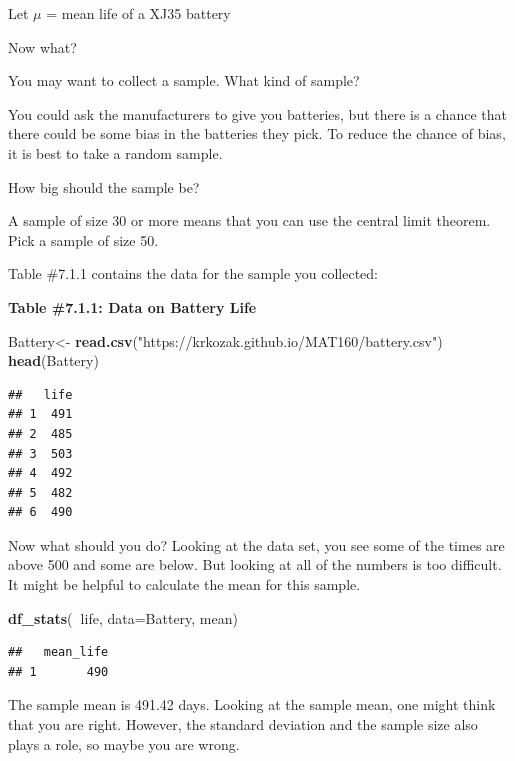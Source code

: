 \documentclass[
]{book}
\newenvironment{Shaded}{\begin{snugshade}}{\end{snugshade}}
\newcommand{\DataTypeTok}[1]{\textcolor[rgb]{0.13,0.29,0.53}{#1}}
\newcommand{\KeywordTok}[1]{\textcolor[rgb]{0.13,0.29,0.53}{\textbf{#1}}}
\newcommand{\NormalTok}[1]{#1}
\newcommand{\OperatorTok}[1]{\textcolor[rgb]{0.81,0.36,0.00}{\textbf{#1}}}
\newcommand{\StringTok}[1]{\textcolor[rgb]{0.31,0.60,0.02}{#1}}
\begin{document}
Let \(\mu\) = mean life of a XJ35 battery

Now what?

You may want to collect a sample. What kind of sample?

You could ask the manufacturers to give you batteries, but there is a chance that there could be some bias in the batteries they pick. To reduce the chance of bias, it is best to take a random sample.

How big should the sample be?

A sample of size 30 or more means that you can use the central limit theorem. Pick a sample of size 50.

Table \#7.1.1 contains the data for the sample you collected:

\textbf{Table \#7.1.1: Data on Battery Life}

\begin{Shaded}
\begin{Highlighting}[]
\NormalTok{Battery<-}\StringTok{ }\KeywordTok{read.csv}\NormalTok{(}\StringTok{"https://krkozak.github.io/MAT160/battery.csv"}\NormalTok{)}
\KeywordTok{head}\NormalTok{(Battery)}
\end{Highlighting}
\end{Shaded}

\begin{verbatim}
##   life
## 1  491
## 2  485
## 3  503
## 4  492
## 5  482
## 6  490
\end{verbatim}

Now what should you do? Looking at the data set, you see some of the times are above 500 and some are below. But looking at all of the numbers is too difficult. It might be helpful to calculate the mean for this sample.

\begin{Shaded}
\begin{Highlighting}[]
\KeywordTok{df_stats}\NormalTok{(}\OperatorTok{~}\NormalTok{life, }\DataTypeTok{data=}\NormalTok{Battery, mean)}
\end{Highlighting}
\end{Shaded}

\begin{verbatim}
##   mean_life
## 1       490
\end{verbatim}

The sample mean is 491.42 days. Looking at the sample mean, one might think that you are right. However, the standard deviation and the sample size also plays a role, so maybe you are wrong.
\end{document}
